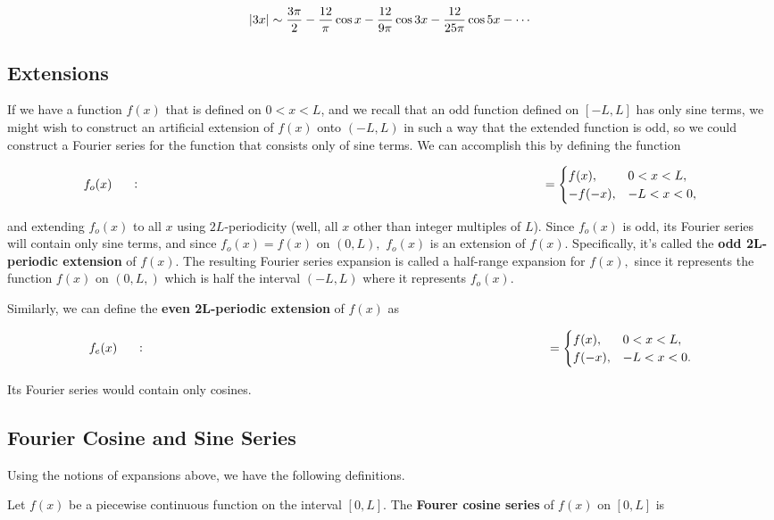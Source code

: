 \documentclass{article}
\begin{document}
\[ \left| 3x \right| \sim \frac{3 \pi}{2} - \frac{12}{\pi}\cos{x} - \frac{12}{9 \pi}\cos{3x} - \frac{12}{25\pi}\cos{5x} - \cdots \]

\subsection{Extensions}

If we have a function $f(x)$ that is defined on $0 < x < L$, and we recall that an odd function defined on $[-L, L]$ has only sine terms, we might wish to construct an artificial extension of $f(x)$ onto $(-L, L)$ in such a way that the extended function is odd, so we could construct a Fourier series for the function that consists only of sine terms. We can accomplish this by defining the function

\[ f_o(x) \mathrel{\vcenter{:}}= \begin{cases} 
f(x), & 0 < x < L, \\
-f(-x), & -L < x < 0, \end{cases} \]

and extending $f_o(x)$ to all $x$ using $2L$-periodicity (well, all $x$ other than \@{integer} multiples of $L$). Since $f_o(x)$ is odd, its Fourier series will contain only sine terms, and since $f_o(x) = f(x)$ on $(0, L),$ $f_o(x)$ is an extension of $f(x)$. Specifically, it's called the \textbf{odd 2L-periodic extension} of $f(x).$ The resulting Fourier series expansion is called a half-range expansion for $f(x),$ since it represents the function $f(x)$ on $(0, L,)$ which is half the interval $(-L, L)$ where it represents $f_o(x).$

Similarly, we can define the \textbf{even 2L-periodic extension} of $f(x)$ as

\[ f_e(x) \mathrel{\vcenter{:}}= \begin{cases} 
f(x), & 0 < x < L, \\
f(-x), & -L < x < 0. \end{cases} \]

Its Fourier series would contain only cosines.

\subsection{Fourier Cosine and Sine Series}

Using the notions of expansions above, we have the following definitions.

Let $f(x)$ be a piecewise continuous function on the interval $[0, L].$ The \textbf{Fourer cosine series} of $f(x)$ on $[0, L]$ is
\end{document}
